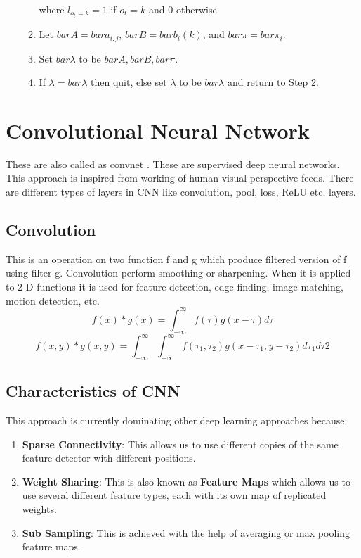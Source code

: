 \documentclass[11pt]{report}
\begin{document}
\begin{enumerate}
\begin{enumerate}
    where $l_{o_t = k} = 1$ if $o_t = k$ and 0 otherwise. 
\item Let $bar{A} = {bar{a}_{i,j}}$, $bar{B} = {bar{b}_i(k)}$, and $bar{\pi} = {{bar{\pi}_i}}$.
\item Set $bar{\lambda}$ to be ${bar{A}, bar{B}, bar{\pi}}$.
\item If $\lambda = bar{\lambda}$ then quit, else set $\lambda$ to be $bar{\lambda}$ and return to Step 2. 
\end{enumerate}


\end{enumerate}





                        



\newpage
\section{Convolutional Neural Network}
These are also called as convnet \cite{cnn} . These are supervised deep neural networks. This approach is inspired from working of human visual perspective feeds. There are different types of layers in CNN like convolution, pool, loss, ReLU etc. layers.

\subsection{Convolution }
This is an operation on two function f and g which produce filtered version of f using filter g. Convolution perform smoothing or sharpening. When it is applied to 2-D functions it is used for feature detection, edge finding, image matching, motion detection, etc.
\begin{equation}
f(x) * g(x)= \int_{-\infty}^{\infty} f(\tau) g(x- \tau) d\tau
\end{equation} 
\begin{equation}
f(x,y) * g(x,y)= \int_{-\infty}^{\infty}\int_{-\infty}^{\infty} f(\tau_1,\tau_2) g(x- \tau_1,y-\tau_2) d\tau_1 d\tau2
\end{equation} 

\subsection{Characteristics of CNN}
This approach is currently dominating other deep learning approaches because:
\begin{enumerate}
\item \textbf{Sparse Connectivity}: This allows us to use different copies of the same feature detector with different positions.
\item \textbf{Weight Sharing}: This is also known as \textbf{Feature Maps} which allows us to use several different feature types, each with its own map of replicated weights.
\item \textbf{Sub Sampling}: This is achieved with the help of averaging or max pooling feature maps.
\end{enumerate}
\end{document}
